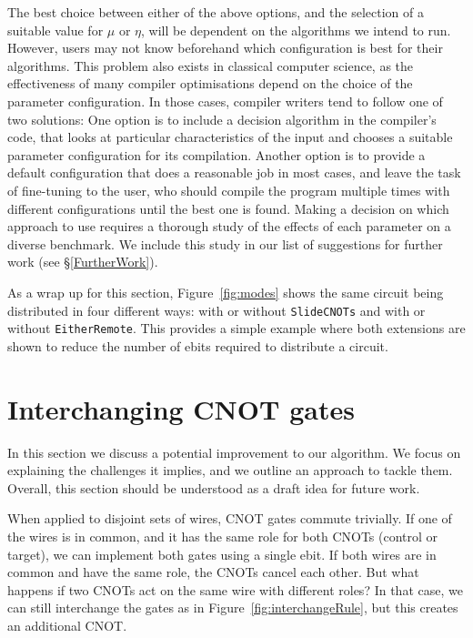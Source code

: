 The best choice between either of the above options, and the selection of a suitable value for \(\mu\) or \(\eta\), will be dependent on the algorithms we intend to run. However, users may not know beforehand which configuration is best for their algorithms. This problem also exists in classical computer science, as the effectiveness of many compiler optimisations depend on the choice of the parameter configuration. In those cases, compiler writers tend to follow one of two solutions: One option is to include a decision algorithm in the compiler's code, that looks at particular characteristics of the input and chooses a suitable parameter configuration for its compilation. Another option is to provide a default configuration that does a reasonable job in most cases, and leave the task of fine-tuning to the user, who should compile the program multiple times with different configurations until the best one is found. Making a decision on which approach to use requires a thorough study of the effects of each parameter on a diverse benchmark. We include this study in our list of suggestions for further work (see \S\ref{FurtherWork}).


As a wrap up for this section, Figure~\ref{fig:modes} shows the same circuit being distributed in four different ways: with or without \texttt{SlideCNOTs} and with or without \texttt{EitherRemote}. This provides a simple example where both extensions are shown to reduce the number of ebits required to distribute a circuit.



\section{Interchanging CNOT gates}
\label{Interchange}

In this section we discuss a potential improvement to our algorithm. We focus on explaining the challenges it implies, and we outline an approach to tackle them. Overall, this section should be understood as a draft idea for future work. 

When applied to disjoint sets of wires, CNOT gates commute trivially. If one of the wires is in common, and it has the same role for both CNOTs (control or target), we can implement both gates using a single ebit. If both wires are in common and have the same role, the CNOTs cancel each other. But what happens if two CNOTs act on the same wire with different roles? In that case, we can still interchange the gates as in Figure~\ref{fig:interchangeRule}, but this creates an additional CNOT.

